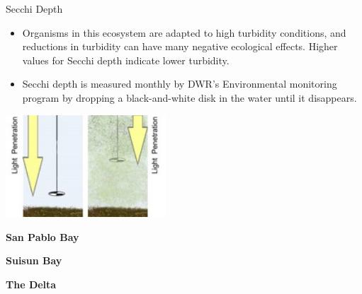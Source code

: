 \documentclass[]{article}\usepackage[]{graphicx}\usepackage[]{color}
\begin{document}
\begin{Row}
  \begin{Cell}{1}
    \begin{center}
      {\Huge Secchi Depth}
    \end{center}
  \end{Cell}
\end{Row}

\begin{Row}
  \begin{Cell}{8}
    \begin{center}
      {\large 
        \begin{itemize}[leftmargin=2cm,rightmargin=2cm]
          \item Organisms in this ecosystem are adapted to high turbidity conditions, 
          and reductions in turbidity can have many negative ecological effects. Higher 
          values for Secchi depth indicate lower turbidity.
          \item Secchi depth is measured monthly by DWR’s Environmental monitoring 
          program by dropping a black-and-white disk in the water until it disappears.
        \end{itemize}
      }
    \end{center}
  \end{Cell}

  \begin{Cell}{2}
    \includegraphics[width=6cm,align=m]{figures/secchi/secchi_diagram.jpg}
  \end{Cell}
\end{Row}

\vspace{30pt}

\begin{Row}
  \begin{Cell}{4}
    \begin{center}
      {\Large {\bf San Pablo Bay}}
    \end{center}
  \end{Cell}
  \begin{Cell}{4}
    \begin{center}
      {\Large {\bf Suisun Bay}}
    \end{center}
  \end{Cell}
  \begin{Cell}{4}
    \begin{center}
      {\Large {\bf The Delta}}
    \end{center}
  \end{Cell}
\end{Row}
\end{document}
